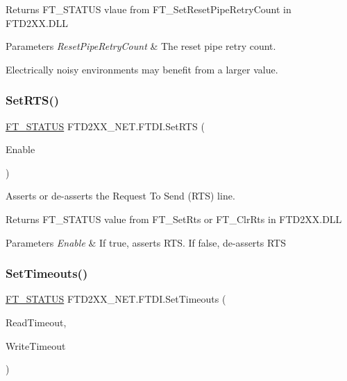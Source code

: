 \begin{DoxyReturn}{Returns}
F\+T\+\_\+\+S\+T\+A\+T\+US vlaue from F\+T\+\_\+\+Set\+Reset\+Pipe\+Retry\+Count in F\+T\+D2\+X\+X.\+D\+LL
\end{DoxyReturn}

\begin{DoxyParams}{Parameters}
{\em Reset\+Pipe\+Retry\+Count} & The reset pipe retry count.\\
\hline
\end{DoxyParams}
Electrically noisy environments may benefit from a larger value.\mbox{\label{class_f_t_d2_x_x___n_e_t_1_1_f_t_d_i_a01e338c929efac4f87154be24fe71ae2}} 
\subsubsection{\texorpdfstring{SetRTS()}{SetRTS()}}
{\footnotesize\ttfamily \mbox{\hyperlink{class_f_t_d2_x_x___n_e_t_1_1_f_t_d_i_aabe20ad905cc4ccc1e35dd5b877d9a83}{F\+T\+\_\+\+S\+T\+A\+T\+US}} F\+T\+D2\+X\+X\+\_\+\+N\+E\+T.\+F\+T\+D\+I.\+Set\+R\+TS (\begin{DoxyParamCaption}\item[{bool}]{Enable }\end{DoxyParamCaption})}



Asserts or de-\/asserts the Request To Send (R\+TS) line. 

\begin{DoxyReturn}{Returns}
F\+T\+\_\+\+S\+T\+A\+T\+US value from F\+T\+\_\+\+Set\+Rts or F\+T\+\_\+\+Clr\+Rts in F\+T\+D2\+X\+X.\+D\+LL
\end{DoxyReturn}

\begin{DoxyParams}{Parameters}
{\em Enable} & If true, asserts R\+TS. If false, de-\/asserts R\+TS\\
\hline
\end{DoxyParams}
\mbox{\label{class_f_t_d2_x_x___n_e_t_1_1_f_t_d_i_a0aba1005c6aef6edadc8817844c09c66}} 
\subsubsection{\texorpdfstring{SetTimeouts()}{SetTimeouts()}}
{\footnotesize\ttfamily \mbox{\hyperlink{class_f_t_d2_x_x___n_e_t_1_1_f_t_d_i_aabe20ad905cc4ccc1e35dd5b877d9a83}{F\+T\+\_\+\+S\+T\+A\+T\+US}} F\+T\+D2\+X\+X\+\_\+\+N\+E\+T.\+F\+T\+D\+I.\+Set\+Timeouts (\begin{DoxyParamCaption}\item[{U\+Int32}]{Read\+Timeout,  }\item[{U\+Int32}]{Write\+Timeout }\end{DoxyParamCaption})}



